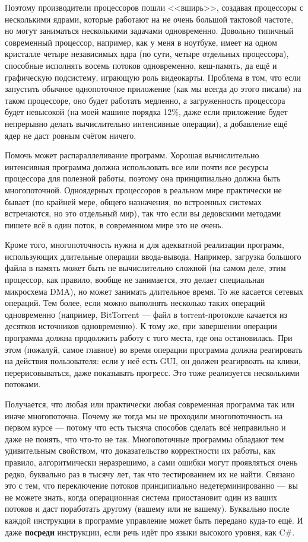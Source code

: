 \documentclass[a5paper]{article}
\begin{document}
Поэтому производители процессоров пошли <<вширь>>, создавая процессоры с несколькими ядрами, которые работают на не очень большой тактовой частоте, но могут заниматься несколькими задачами одновременно. Довольно типичный современный процессор, например, как у меня в ноутбуке, имеет на одном кристалле четыре независимых ядра (по сути, четыре отдельных процессора), способные исполнять восемь потоков одновременно, кеш-память, да ещё и графическую подсистему, играющую роль видеокарты. Проблема в том, что если запустить обычное однопоточное приложение (как мы всегда до этого писали) на таком процессоре, оно будет работать медленно, а загруженность процессора будет невысокой (на моей машине порядка 12\%, даже если приложение будет непрерывно делать вычислительно интенсивные операции), а добавление ещё ядер не даст ровным счётом ничего.

Помочь может распараллеливание программ. Хорошая вычислительно интенсивная программа должна использовать все или почти все ресурсы процессора для полезной работы, поэтому она принципиально должна быть многопоточной. Одноядерных процессоров в реальном мире практически не бывает (по крайней мере, общего назначения, во встроенных системах встречаются, но это отдельный мир), так что если вы дедовскими методами пишете всё в один поток, в современном мире это не очень.

Кроме того, многопоточность нужна и для адекватной реализации программ, использующих длительные операции ввода-вывода. Например, загрузка большого файла в память может быть не вычислительно сложной (на самом деле, этим процессор, как правило, вообще не занимается, это делает специальная микросхема DMA), но может занимать длительное время. То же касается сетевых операций. Тем более, если можно выполнять несколько таких операций одновременно (например, BitTorrent --- файл в torrent-протоколе качается из десятков источников одновременно). К тому же, при завершении операции программа должна продолжить работу с того места, где она остановилась. При этом (пожалуй, самое главное) во время операции программа должна реагировать на действия пользователя: если у неё есть GUI, он должен реагирвоать на клики, перерисовываться, даже показывать прогресс. Это тоже реализуется несколькими потоками.

Получается, что любая или практически любая современная программа так или иначе многопоточна. Почему же тогда мы не проходили многопоточность на первом курсе --- потому что есть тысяча способов сделать всё неправильно и даже не понять, что что-то не так. Многопоточные программы обладают тем удивительным свойством, что доказательство корректности их работы, как правило, алгоритмически неразрешимо, а сами ошибки могут проявляться очень редко, буквально раз в тысячу лет, так что тестированием их не найти. Связано это с тем, что переключение потоков принципиально недетерминированно --- вы не можете знать, когда операционная система приостановит один из ваших потоков и даст поработать другому (вашему или не вашему). Буквально после каждой инструкции в программе управление может быть передано куда-то ещё. И даже \textbf{посреди} инструкции, если речь идёт про языки высокого уровня, как C\#.
\end{document}
